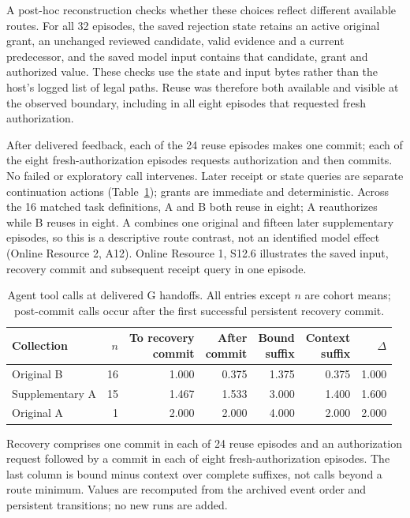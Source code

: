 \documentclass[pdflatex,sn-basic]{sn-jnl}
\begin{document}
A post-hoc reconstruction checks whether these choices reflect different available routes. For all 32 episodes, the saved rejection state retains an active original grant, an unchanged reviewed candidate, valid evidence and a current predecessor, and the saved model input contains that candidate, grant and authorized value. These checks use the state and input bytes rather than the host's logged list of legal paths. Reuse was therefore both available and visible at the observed boundary, including in all eight episodes that requested fresh authorization.

After delivered feedback, each of the 24 reuse episodes makes one commit; each of the eight fresh-authorization episodes requests authorization and then commits. No failed or exploratory call intervenes. Later receipt or state queries are separate continuation actions (Table~\ref{tab:recovery-decomposition}); grants are immediate and deterministic. Across the 16 matched task definitions, A and B both reuse in eight; A reauthorizes while B reuses in eight. A combines one original and fifteen later supplementary episodes, so this is a descriptive route contrast, not an identified model effect (Online Resource 2, A12). Online Resource 1, S12.6 illustrates the saved input, recovery commit and subsequent receipt query in one episode.

\begin{table}[tbp]
\caption{Agent tool calls at delivered G handoffs. All entries except $n$ are cohort means; post-commit calls occur after the first successful persistent recovery commit.}\label{tab:recovery-decomposition}
\centering\small
\setlength{\tabcolsep}{3pt}
\begin{tabular*}{\textwidth}{@{\extracolsep{\fill}}lrrrrrr@{}}
\toprule
Collection & $n$ & \shortstack{To recovery\\commit} & \shortstack{After\\commit} & \shortstack{Bound\\suffix} & \shortstack{Context\\suffix} & $\Delta$ \\
\midrule
Original B & 16 & 1.000 & 0.375 & 1.375 & 0.375 & 1.000 \\
Supplementary A & 15 & 1.467 & 1.533 & 3.000 & 1.400 & 1.600 \\
Original A & 1 & 2.000 & 2.000 & 4.000 & 2.000 & 2.000 \\
\bottomrule
\end{tabular*}
\par\smallskip\begin{minipage}{\textwidth}\small Recovery comprises one commit in each of 24 reuse episodes and an authorization request followed by a commit in each of eight fresh-authorization episodes. The last column is bound minus context over complete suffixes, not calls beyond a route minimum. Values are recomputed from the archived event order and persistent transitions; no new runs are added.\end{minipage}
\end{table}
\end{document}
